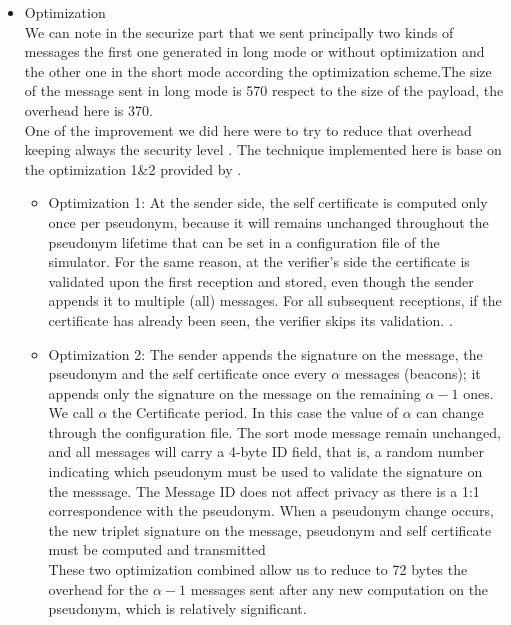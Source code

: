 \begin{itemize}
\item Optimization\\

We can note in the securize part  that we sent principally two kinds of messages the first one generated in long mode or without optimization and the other one in the short mode according the optimization scheme.The size of the message sent in long mode is 570 respect to the size of the payload, the overhead here is 370.\\
 One of the improvement we did here were to try to reduce that overhead keeping always the security level . The technique implemented  here is base on the  optimization 1\&2 provided by \cite{calandriello}. \\
 \begin{itemize}
 \item Optimization 1: At the sender side, the self certificate  is computed only once per pseudonym, because it will remains unchanged throughout the pseudonym lifetime that can be set in a configuration file of the simulator. For the same reason, at the verifier's side the certificate is validated upon the first reception and stored, even though the sender appends it to multiple (all) messages. For all subsequent receptions, if the certificate has already been seen, the verifier skips its validation.
 .\\
 \item Optimization 2: The sender appends  the signature on the message, the pseudonym and the self certificate once  every $\alpha$ messages (beacons); it appends only the signature on the message  on the remaining $\alpha-1$ ones. We call $\alpha$ the Certificate period. In this case the value of $\alpha$ can change through the configuration file. The sort mode message remain  unchanged, and all messages will carry a 4-byte  ID field, that is, a random number indicating which pseudonym must be used to validate the signature on the messsage. The Message ID does not affect privacy as there is a 1:1 correspondence with the pseudonym. When a pseudonym change occurs, the new triplet signature on the message, pseudonym and self certificate  must be computed and transmitted\\
  These two optimization combined allow us to reduce to 72 bytes the overhead for the $\alpha-1$ messages sent after any new computation on the pseudonym, which is relatively significant.
\end{itemize}
\end{itemize}


